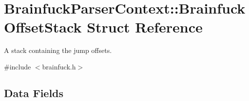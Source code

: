 \hypertarget{structBrainfuckParserContext_1_1BrainfuckOffsetStack}{}\section{Brainfuck\+Parser\+Context\+:\+:Brainfuck\+Offset\+Stack Struct Reference}
\label{structBrainfuckParserContext_1_1BrainfuckOffsetStack}


A stack containing the jump offsets.  




{\ttfamily \#include $<$brainfuck.\+h$>$}

\subsection*{Data Fields}
